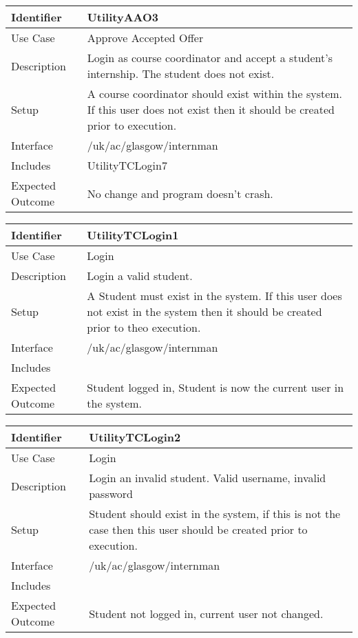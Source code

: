 \begin{tabularx}{\textwidth}{|T|L|}
\hline
Identifier & UtilityAAO3\\
\hline
Use Case & Approve Accepted Offer \\
\hline
Description & Login as course coordinator and accept a student's internship.
The student does not exist.\\
\hline
Setup & A course coordinator should exist within the system. If this
user does not exist then it should be created prior to execution.\\
\hline
Interface & /uk/ac/glasgow/internman \\
\hline
Includes & UtilityTCLogin7 \\
\hline
Expected Outcome & No change and program doesn't crash.\\
\hline
\end{tabularx}

\vspace{2em}

\begin{tabularx}{\textwidth}{|T|L|}
\hline
Identifier & UtilityTCLogin1\\
\hline
Use Case & Login\\
\hline
Description & Login a valid student. \\
\hline
Setup & A Student must exist in the system. If this user does not
exist in the system then it should be created prior to theo execution. \\
\hline
Interface & /uk/ac/glasgow/internman \\
\hline
Includes & \\
\hline
Expected Outcome & Student logged in, Student is now the current user
in the system.\\
\hline
\end{tabularx}

\vspace{2em}

\begin{tabularx}{\textwidth}{|T|L|}
\hline
Identifier & UtilityTCLogin2\\
\hline
Use Case & Login \\
\hline
Description & Login an invalid student. Valid username, invalid password\\
\hline
Setup & Student should exist in the system, if this is not the case
then this user should be created prior to execution.\\
\hline
Interface & /uk/ac/glasgow/internman \\
\hline
Includes & \\
\hline
Expected Outcome & Student not logged in, current user not changed.\\
\hline
\end{tabularx}

